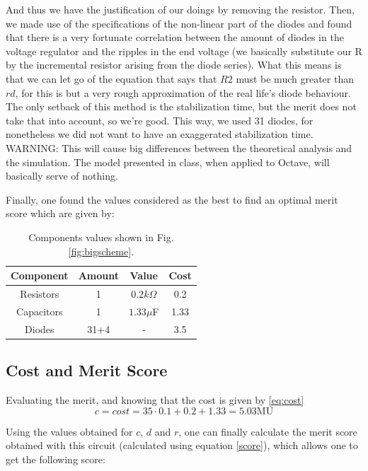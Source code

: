 And thus we have the justification of our doings by removing the resistor. Then, we made use of the specifications of the non-linear part of the diodes and found that there is a very fortunate correlation between the amount of diodes in the voltage regulator and the ripples in the end voltage (we basically substitute our R by the incremental resistor arising from the diode series). What this means is that we can let go of the equation that says that $R2$ must be much greater than $rd$, for this is but a very rough approximation of the real life's diode behaviour. The only setback of this method is the stabilization time, but the merit does not take that into account, so we're good. This way, we used 31 diodes, for nonetheless we did not want to have an exaggerated stabilization time. WARNING: This will cause big differences between the theoretical analysis and the simulation. The model presented in class, when applied to Octave, will basically serve of nothing.

Finally, one found the values considered as the best to find an optimal merit score which are given by:

\begin{table}[H]
    \centering
    \begin{tabular}{|c|c|c|c|}
    \hline
        \textbf{Component} &  \textbf{Amount} & \textbf{Value} & \textbf{Cost}\\
        \hline
        \hline
        Resistors & 1 & $0.2k\Omega$ & 0.2\\
        \hline
        Capacitors & 1 &  $1.33\mu$F & 1.33\\
        \hline
        Diodes & 31+4 & - & 3.5 \\
        \hline
    \end{tabular}
    \caption{Components values shown in Fig. \ref{fig:bigscheme}.}
    \label{tab:tentativas}
\end{table}


\subsection{Cost and Merit Score}
Evaluating the merit, and knowing that the cost is given by \eqref{eq:cost}
\begin{equation}
    c = cost = 35 \cdot 0.1 + 0.2 + 1.33 =  5.03\text{MU}
    \label{eq:cost}
\end{equation}

Using the values obtained for $c$, $d$ and $r$, one can finally calculate the merit score obtained with this circuit (calculated using equation \eqref{score}), which allows one to get the following score:

